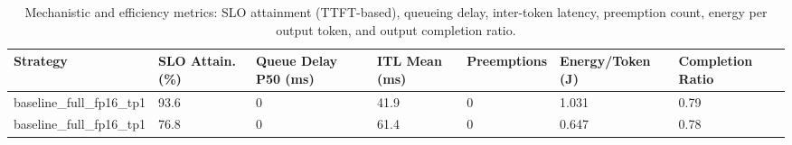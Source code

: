 \begin{table}
\caption{Mechanistic and efficiency metrics: SLO attainment (TTFT-based), queueing delay, inter-token latency, preemption count, energy per output token, and output completion ratio.}
\label{tab:efficiency}
\begin{tabular}{lllllll}
\toprule
Strategy & SLO Attain. (\%) & Queue Delay P50 (ms) & ITL Mean (ms) & Preemptions & Energy/Token (J) & Completion Ratio \\
\midrule
baseline\_full\_fp16\_tp1 & 93.6 & 0 & 41.9 & 0 & 1.031 & 0.79 \\
baseline\_full\_fp16\_tp1 & 76.8 & 0 & 61.4 & 0 & 0.647 & 0.78 \\
\bottomrule
\end{tabular}
\end{table}
